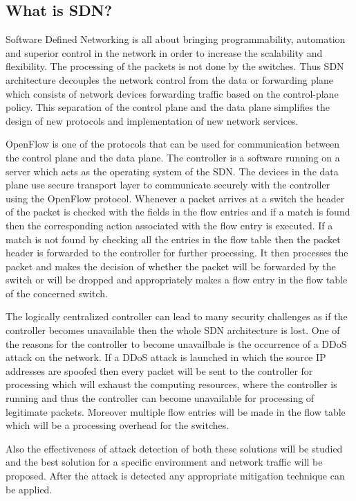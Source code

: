 \documentclass[12pt,a4paper,final]{report}
\begin{document}
\subsection{What is SDN?}
Software Defined Networking is all about bringing programmability, automation and superior control in the network in order to increase the scalability and flexibility. The processing of the packets is not done by the switches. Thus SDN architecture decouples the network control from the data or forwarding plane which consists of network devices forwarding traffic based on the control-plane policy. This separation of the control plane and the data plane simplifies the design of new protocols and implementation of new network services. 

OpenFlow is one of the protocols that can be used for communication between the control plane and the data plane. The controller is a software running on a server which acts as the operating system of the SDN. The devices in the data plane use secure transport layer to communicate securely with the controller using the OpenFlow protocol. Whenever a packet arrives at a switch the header of the packet is checked with the fields in the flow entries and if a match is found then the corresponding action associated with the flow entry is executed. If a match is not found by checking all the entries in the flow table then the packet header is forwarded to the controller for further processing. It then processes the packet and makes the decision of whether the packet will be forwarded by the switch or will be dropped and appropriately makes a flow entry in the flow table of the concerned switch.

The logically centralized controller can lead to many security challenges as if the controller becomes unavailable then the whole SDN architecture is lost. One of the reasons for the controller to become unavailbale is the occurrence of a DDoS attack on the network. If a DDoS attack is launched in which the source IP addresses are spoofed then every packet will be sent to the controller for processing which will exhaust the computing resources, where the controller is running and thus the controller can become unavailable for processing of legitimate packets.
Moreover multiple flow entries will be made in the flow table which will be a processing overhead for the switches.

Also the effectiveness of attack detection of both these solutions will be studied and the best solution for a specific environment and network traffic will be proposed. After the attack is detected any appropriate mitigation technique can be applied.
\end{document}
